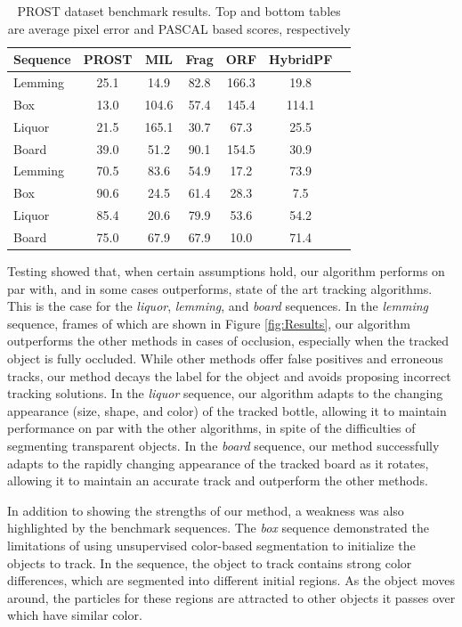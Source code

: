  \begin{table}
\caption{PROST dataset benchmark results. Top and bottom tables are average pixel error and PASCAL based scores, respectively}
\begin{center}
\begin{tabular}{|l|c|c|c|c|c|c|}
\hline
Sequence &  PROST  & MIL & Frag & ORF & HybridPF \\
\hline\hline
Lemming & 25.1 & 14.9 & 82.8 & 166.3 & 19.8\\
Box & 13.0 & 104.6 & 57.4 & 145.4 & 114.1\\
Liquor & 21.5 & 165.1 & 30.7 & 67.3 & 25.5\\
Board & 39.0 & 51.2 & 90.1 & 154.5 & 30.9\\
\hline
\hline
\hline\hline
Lemming & 70.5 & 83.6 & 54.9 & 17.2 & 73.9\\
Box & 90.6 & 24.5 & 61.4 & 28.3 & 7.5\\
Liquor & 85.4 & 20.6 & 79.9 & 53.6 & 54.2\\
Board & 75.0 & 67.9 & 67.9 & 10.0 & 71.4\\
\hline
\end{tabular}
\end{center}

\label{table:results}
\end{table}


Testing showed that, when certain assumptions hold, our algorithm performs on par with, and in some cases outperforms, state of the art tracking algorithms. This is the case for the \textit{liquor}, \textit{lemming}, and \textit{board} sequences. In the \textit{lemming} sequence, frames of which are shown in Figure \ref{fig:Results}, our algorithm outperforms the other methods in cases of occlusion, especially when the tracked object is fully occluded. While other methods offer false positives and erroneous tracks, our method decays the label for the object and avoids proposing incorrect tracking solutions. In the \textit{liquor} sequence, our algorithm adapts to the changing appearance (size, shape, and color) of the tracked bottle, allowing it to maintain performance on par with the other algorithms, in spite of the difficulties of segmenting transparent objects. In the \textit{board} sequence, our method successfully adapts to the rapidly changing appearance of the tracked board as it rotates, allowing it 
to maintain an accurate track and outperform the other methods.

In addition to showing the strengths of our method, a weakness was also highlighted by the benchmark sequences. The \textit{box} sequence  demonstrated the limitations of using unsupervised color-based segmentation to initialize the objects to track. In the sequence, the object to track contains strong color differences, which are segmented into different initial regions. As the object moves around, the particles for these regions are attracted to other objects it passes over which have similar color.  

